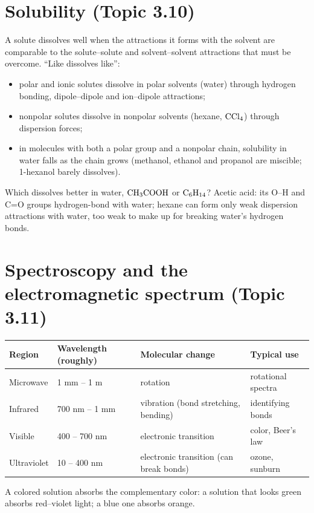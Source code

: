 \documentclass[11pt]{article}
\begin{document}
\section{Solubility (Topic 3.10)}\label{t:3.10}
A solute dissolves well when the attractions it forms with the solvent are comparable to the solute--solute and solvent--solvent attractions that must be overcome. ``Like dissolves like'':
\begin{itemize}
\item polar and ionic solutes dissolve in polar solvents (water) through hydrogen bonding, dipole--dipole and ion--dipole attractions;
\item nonpolar solutes dissolve in nonpolar solvents (hexane, $\ce{CCl4}$) through dispersion forces;
\item in molecules with both a polar group and a nonpolar chain, solubility in water falls as the chain grows (methanol, ethanol and propanol are miscible; 1-hexanol barely dissolves).
\end{itemize}
 Which dissolves better in water, $\ce{CH3COOH}$ or $\ce{C6H14}$? Acetic acid: its O--H and C=O groups hydrogen-bond with water; hexane can form only weak dispersion attractions with water, too weak to make up for breaking water's hydrogen bonds.

\section{Spectroscopy and the electromagnetic spectrum (Topic 3.11)}\label{t:3.11}
\begin{center}
\begin{tabular}{llll}\toprule
Region & Wavelength (roughly) & Molecular change & Typical use \\ \midrule
Microwave & 1 mm -- 1 m & rotation & rotational spectra \\
Infrared & 700 nm -- 1 mm & vibration (bond stretching, bending) & identifying bonds \\
Visible & 400 -- 700 nm & electronic transition & color, Beer's law \\
Ultraviolet & 10 -- 400 nm & electronic transition (can break bonds) & ozone, sunburn \\ \bottomrule
\end{tabular}
\end{center}
A colored solution absorbs the complementary color: a solution that looks green absorbs red--violet light; a blue one absorbs orange.
\end{document}
